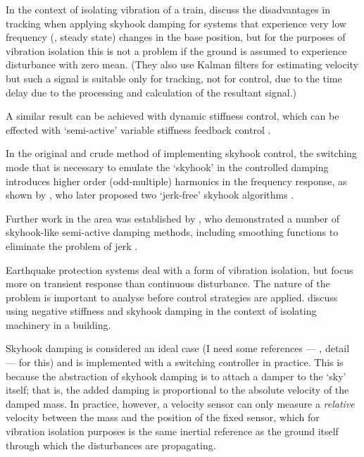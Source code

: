 In the context of isolating vibration of a train, \textcite{li1999} discuss the disadvantages in tracking when applying skyhook damping for systems that experience very low frequency (\ie, steady state) changes in the base position, but for the purposes of vibration isolation this is not a problem if the ground is assumed to experience disturbance with zero mean.
(They also use Kalman filters for estimating velocity but such a signal is suitable only for tracking, not for control, due to the time delay due to the processing and calculation of the resultant signal.)

A similar result  can be achieved with dynamic stiffness control, which can be effected with `semi-active' variable stiffness feedback control \cite{leavitt2007}.

In the original and crude method of implementing skyhook control, the switching mode that is necessary to emulate the `skyhook' in the controlled damping introduces higher order (odd-multiple) harmonics in the frequency response, as shown by \textcite{ahmadian2001}, who later proposed two `jerk-free' skyhook algorithms \cite{ahmadian2004}.

Further work in the area was established by \textcite{liu2002}, who demonstrated a number of skyhook-like semi-active damping methods, including smoothing functions to eliminate the problem of jerk
\cite{liu2005}.

Earthquake protection systems deal with a form of vibration isolation, but focus more on transient response than continuous disturbance.
The nature of the problem is important to analyse before control
strategies are applied.
\textcite{gavin2007} discuss using negative stiffness and skyhook damping in the context of isolating machinery in a building.

Skyhook damping is considered an ideal case (I need some references — \ie, detail — for this) and is implemented with a switching controller in practice.
This is because the abstraction of skyhook damping is to attach a damper to the `sky' itself; that is, the added damping is proportional to the absolute velocity of the damped mass.
In practice, however, a velocity sensor can only measure a \emph{relative} velocity between the mass and the position of the fixed sensor, which for vibration isolation purposes is the same inertial reference as the ground itself through which the disturbances are propagating.

